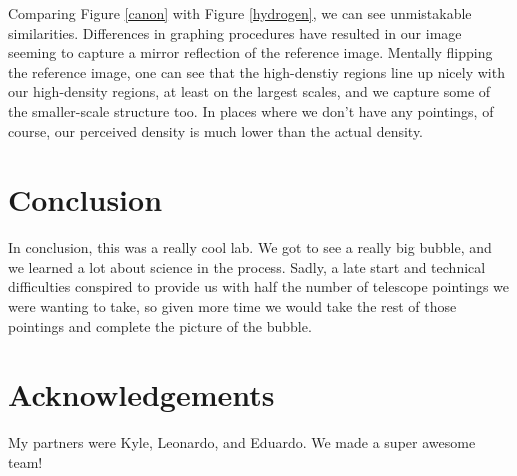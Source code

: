 \documentclass[11pt]{article}
\begin{document}
Comparing Figure \ref{canon} with Figure \ref{hydrogen}, we can see unmistakable similarities. Differences in graphing procedures have resulted in our image seeming to capture a mirror reflection of the reference image. Mentally flipping the reference image, one can see that the high-denstiy regions line up nicely with our high-density regions, at least on the largest scales, and we capture some of the smaller-scale structure too. In places where we don't have any pointings, of course, our perceived density is much lower than the actual density. 

\section{Conclusion}
In conclusion, this was a really cool lab. We got to see a really big bubble, and we learned a lot about science in the process. Sadly, a late start and technical difficulties conspired to provide us with half the number of telescope pointings we were wanting to take, so given more time we would take the rest of those pointings and complete the picture of the bubble. 
\section{Acknowledgements}
My partners were Kyle, Leonardo, and Eduardo. We made a super awesome team!
\end{document}
